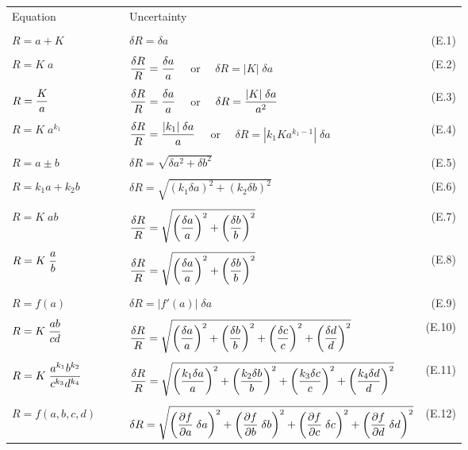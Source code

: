 \documentclass[11pt,twoside]{report}
\begin{document}
\begin{center}
\begin{tabular}{lclr}      
{\Large Equation}&$\quad$&{\Large Uncertainty}\\ \\
${\displaystyle R= a+K }$&&
${\displaystyle \delta R= \delta a
}$&(E.1)\\ \\
${\displaystyle R= K\; a }$&&
${\displaystyle {\delta R \over R}={\delta a \over a}
}\quad$ or $\quad{\displaystyle {\delta R }={|K|\; \delta a }
}$&(E.2)\\ \\
${\displaystyle R= {K\over a} }$&&
${\displaystyle {\delta R \over R}={\delta a \over a}
}\quad$ or $\quad{\displaystyle {\delta R }={|K|\; \delta a \over a^2}
}$&(E.3)\\ \\
${\displaystyle R= K\; a^{k_1} }$&&
${\displaystyle {\delta R \over R}={|k_1|\;\delta a \over a}
}\quad$ or $\quad{\displaystyle {\delta R }={|k_1K a^{k_1-1}|\; \delta a }
}$&(E.4)\\ \\
${\displaystyle R= a\pm b }$&&
${\displaystyle \delta R= \sqrt{\delta a^2 + \delta b^2} 
}$&(E.5)\\ \\
${\displaystyle R= k_1 a + k_2 b }$&&
${\displaystyle \delta R=\sqrt{
\left({k_1 \delta a}\right)^2+
\left({k_2 \delta b}\right)^2}
}$&(E.6)\\ \\
${\displaystyle R= K\;ab }$&&
${\displaystyle {\delta R \over R}=\sqrt{
\left({\delta a\over a}\right)^2+
\left({\delta b\over b}\right)^2}
}$&(E.7)\\ \\
${\displaystyle R= K\;{a\over b} }$&&
${\displaystyle {\delta R \over R}=\sqrt{
\left({\delta a\over a}\right)^2+
\left({\delta b\over b}\right)^2}
}$&(E.8)\\ \\
${\displaystyle R= f(a) }$&&
${\displaystyle \delta R= |f'(a)|\;\delta a
}$&(E.9)\\ \\
${\displaystyle R=K\;{ab \over cd} }$&&
${\displaystyle {\delta R \over R}=\sqrt{
\left({\delta a\over a}\right)^2+
\left({\delta b\over b}\right)^2+
\left({\delta c\over c}\right)^2+
\left({\delta d\over d}\right)^2} }$&(E.10)\\ \\
${\displaystyle R=K\;{a^{k_1}b^{k_2} \over c^{k_3}d^{k_4}} }$&&
${\displaystyle {\delta R \over R}=\sqrt{
\left({k_1 \delta a\over a}\right)^2+
\left({k_2 \delta b\over b}\right)^2+
\left({k_3 \delta c\over c}\right)^2+
\left({k_4 \delta d\over d}\right)^2} }$&(E.11)\\ \\
${\displaystyle R=f(a,b,c,d) }$&&
${\displaystyle \delta R=\sqrt{
\left({\partial f \over \partial a}\;\delta a\right)^2+
\left({\partial f \over \partial b}\;\delta b\right)^2+
\left({\partial f \over \partial c}\;\delta c\right)^2+
\left({\partial f \over \partial d}\;\delta d\right)^2} }$&(E.12)\\
\end{tabular}
\end{center}
\end{document}
